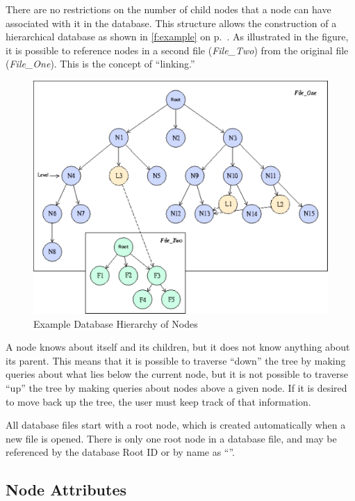 There are no restrictions on the number of child nodes that a node can
have associated with it in the database.
This structure allows the construction of a hierarchical database as
shown in \autoref{f:example} on p.~\pageref*{f:example}.
As illustrated in the figure, it is possible to reference nodes in a
second file (\textit{File\_Two}) from the original file
(\textit{File\_One}).
This is the concept of ``linking.''
\begin{figure}[!htb]
   \centering
   \includegraphics[width=6.0in]{figure}
   \caption{Example Database Hierarchy of Nodes}
   \label{f:example}
\end{figure}

A node knows about itself and its children, but it does not know
anything about its parent.
This means that it is possible to traverse ``down'' the tree by making
queries about what lies below the current node, but it is not possible
to traverse ``up'' the tree by making queries about nodes above a given
node.
If it is desired to move back up the tree, the user must keep track of
that information.

All database files start with a root node, which is created automatically
when a new file is opened.
There is only one root node in a database file, and may be referenced
by the database Root ID or by name as ``\key{/}''.

\subsection{Node Attributes}
\label{s:attributes}

